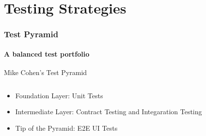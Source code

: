 \documentclass{beamer}
\begin{document}
\section{Testing Strategies}
\begin{frame}
	\frametitle{Test Pyramid}	
	\framesubtitle{A balanced test portfolio }
Mike Cohen's Test Pyramid
\begin{columns}
 \begin{column}{.49\textwidth}
	\begin{itemize}
		\item  Foundation Layer: Unit Tests
		\item Intermediate Layer: Contract Testing and Integaration Testing
		\item Tip of the Pyramid: E2E UI Tests
	\end{itemize}
\end{column}
\end{columns}
\end{frame}

\end{document}
